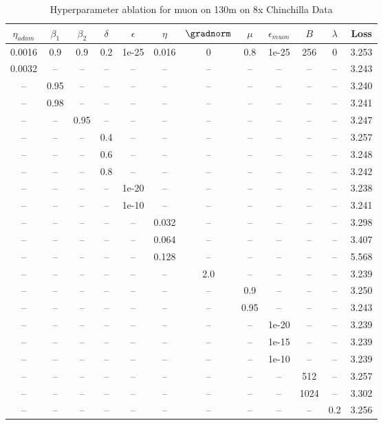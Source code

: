 \begin{table}[h!]
\centering
\caption{Hyperparameter ablation for muon on 130m on 8x Chinchilla Data}
\label{tab:ablation_muon_130m_on_8x_chinchilla_data}
\begin{tabular}{cccccccccccc}
\toprule
$\eta_{adam}$ & $\beta_1$ & $\beta_2$ & $\delta$ & $\epsilon$ & $\eta$ & $\gradnorm$ & $\mu$ & $\epsilon_{muon}$ & $B$ & $\lambda$ & Loss \\
\midrule
0.0016 & 0.9 & 0.9 & 0.2 & 1e-25 & 0.016 & 0 & 0.8 & 1e-25 & 256 & 0 & 3.253 \\
\midrule
0.0032 & -- & -- & -- & -- & -- & -- & -- & -- & -- & -- & 3.243 \\
-- & 0.95 & -- & -- & -- & -- & -- & -- & -- & -- & -- & 3.240 \\
-- & 0.98 & -- & -- & -- & -- & -- & -- & -- & -- & -- & 3.241 \\
-- & -- & 0.95 & -- & -- & -- & -- & -- & -- & -- & -- & 3.247 \\
-- & -- & -- & 0.4 & -- & -- & -- & -- & -- & -- & -- & 3.257 \\
-- & -- & -- & 0.6 & -- & -- & -- & -- & -- & -- & -- & 3.248 \\
-- & -- & -- & 0.8 & -- & -- & -- & -- & -- & -- & -- & 3.242 \\
-- & -- & -- & -- & 1e-20 & -- & -- & -- & -- & -- & -- & 3.238 \\
-- & -- & -- & -- & 1e-10 & -- & -- & -- & -- & -- & -- & 3.241 \\
-- & -- & -- & -- & -- & 0.032 & -- & -- & -- & -- & -- & 3.298 \\
-- & -- & -- & -- & -- & 0.064 & -- & -- & -- & -- & -- & 3.407 \\
-- & -- & -- & -- & -- & 0.128 & -- & -- & -- & -- & -- & 5.568 \\
-- & -- & -- & -- & -- & -- & 2.0 & -- & -- & -- & -- & 3.239 \\
-- & -- & -- & -- & -- & -- & -- & 0.9 & -- & -- & -- & 3.250 \\
-- & -- & -- & -- & -- & -- & -- & 0.95 & -- & -- & -- & 3.243 \\
-- & -- & -- & -- & -- & -- & -- & -- & 1e-20 & -- & -- & 3.239 \\
-- & -- & -- & -- & -- & -- & -- & -- & 1e-15 & -- & -- & 3.239 \\
-- & -- & -- & -- & -- & -- & -- & -- & 1e-10 & -- & -- & 3.239 \\
-- & -- & -- & -- & -- & -- & -- & -- & -- & 512 & -- & 3.257 \\
-- & -- & -- & -- & -- & -- & -- & -- & -- & 1024 & -- & 3.302 \\
-- & -- & -- & -- & -- & -- & -- & -- & -- & -- & 0.2 & 3.256 \\
\bottomrule
\end{tabular}
\end{table}

